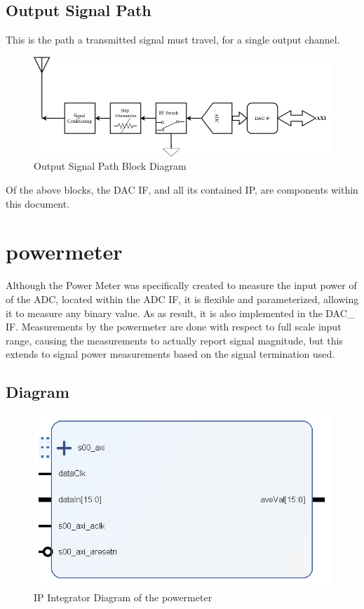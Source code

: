 \documentclass[11pt]{article}
\begin{document}
\subsection{Output Signal Path}
This is the path a transmitted signal must travel, for a single output channel.
\begin{figure}[h!]
	\label{outSigPath}
	\centering
	\includegraphics[width=0.8\linewidth]{images/outputSignalDiagram}
	\caption{Output Signal Path Block Diagram}
\end{figure}
Of the above blocks, the DAC IF, and all its contained IP, are components within this document.

\section{power\textunderscore meter}
Although the Power Meter was specifically created to measure the input power of of the ADC, located within the ADC IF, it is flexible and parameterized,
allowing it to measure any binary value. As as result, it is also implemented in the DAC\_ IF. Measurements by the power\textunderscore meter are 
done with respect to full scale input range, causing the measurements to actually report signal magnitude, but this extends to signal power measurements
based on the signal termination used.
\subsection{Diagram}
\begin{figure}[h!]
	\label{fig:powerMeter}
	\centering
	\includegraphics[width=0.6\linewidth]{images/powerMeter}
	\caption{IP Integrator Diagram of the power\textunderscore meter}
\end{figure}
\end{document}
